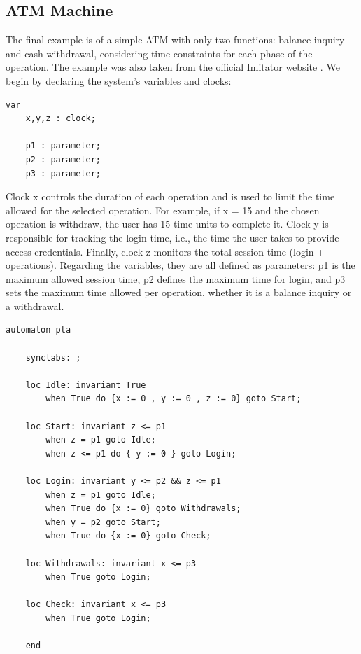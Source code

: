 \subsection{ATM Machine}

The final example is of a simple ATM with only two functions: balance inquiry and cash withdrawal, considering time constraints for each phase of the operation. The example was also taken from the official Imitator website \cite{IMITATOR}. We begin by declaring the system's variables and clocks:


\begin{lstlisting}[language=UPPAAL]
    var
    x,y,z : clock;

    p1 : parameter;
    p2 : parameter;
    p3 : parameter;
\end{lstlisting}


Clock x controls the duration of each operation and is used to limit the time allowed for the selected operation. For example, if x = 15 and the chosen operation is withdraw, the user has 15 time units to complete it. Clock y is responsible for tracking the login time, i.e., the time the user takes to provide access credentials.
Finally, clock z monitors the total session time (login + operations). Regarding the variables, they are all defined as parameters: p1 is the maximum allowed session time, p2 defines the maximum time for login, and p3 sets the maximum time allowed per operation, whether it is a balance inquiry or a withdrawal.

\begin{lstlisting}[language=UPPAAL]
    automaton pta
    
    synclabs: ;

    loc Idle: invariant True
    	when True do {x := 0 , y := 0 , z := 0} goto Start;
    
    loc Start: invariant z <= p1
    	when z = p1 goto Idle;
    	when z <= p1 do { y := 0 } goto Login;
    
    loc Login: invariant y <= p2 && z <= p1
    	when z = p1 goto Idle;
    	when True do {x := 0} goto Withdrawals;
    	when y = p2 goto Start;
    	when True do {x := 0} goto Check;
    
    loc Withdrawals: invariant x <= p3
    	when True goto Login;
    
    loc Check: invariant x <= p3
    	when True goto Login;
    
    end
\end{lstlisting}


